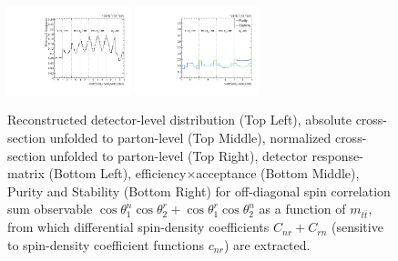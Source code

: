 \begin{figure}[htb]
\begin{center}
 \includegraphics[width=0.32\textwidth]{fig_fullRun2UL/unfolding/combined/TotEff_c_Pnr_mttbar.pdf}
 \includegraphics[width=0.32\textwidth]{fig_fullRun2UL/unfolding/combined/PurStab_c_Pnr_mttbar.pdf} \\
\caption{Reconstructed detector-level distribution (Top Left), absolute cross-section unfolded to parton-level (Top Middle), normalized cross-section unfolded to parton-level (Top Right), detector response-matrix (Bottom Left), efficiency$\times$acceptance (Bottom Middle), Purity and Stability (Bottom Right) for off-diagonal spin correlation sum observable $\cos\theta_{1}^{n}\cos\theta_{2}^{r}+\cos\theta_{1}^{r}\cos\theta_{2}^{n}$ as a function of $m_{t\bar{t}}$, from which differential spin-density coefficients $C_{nr}+C_{rn}$ (sensitive to spin-density coefficient functions $c_{n r}$) are extracted.}
\label{fig:c_Pnr_mttbar}
\end{center}
\end{figure}
\clearpage
